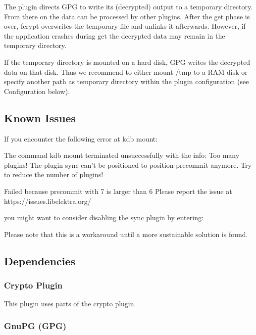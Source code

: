 The plugin directs G\+PG to write its (decrypted) output to a temporary directory. From there on the data can be processed by other plugins. After the {\ttfamily get} phase is over, {\ttfamily fcrypt} overwrites the temporary file and unlinks it afterwards. However, if the application crashes during {\ttfamily get} the decrypted data may remain in the temporary directory.

If the temporary directory is mounted on a hard disk, G\+PG writes the decrypted data on that disk. Thus we recommend to either mount {\ttfamily /tmp} to a R\+AM disk or specify another path as temporary directory within the plugin configuration (see Configuration below).

\subsection*{Known Issues}

If you encounter the following error at {\ttfamily kdb mount}\+: \begin{DoxyVerb}    The command kdb mount terminated unsuccessfully with the info:
    Too many plugins!
    The plugin sync can't be positioned to position precommit anymore.
    Try to reduce the number of plugins!

    Failed because precommit with 7 is larger than 6
    Please report the issue at https://issues.libelektra.org/
\end{DoxyVerb}


you might want to consider disabling the sync plugin by entering\+: 


Please note that this is a workaround until a more sustainable solution is found.

\subsection*{Dependencies}

\subsubsection*{Crypto Plugin}

This plugin uses parts of the {\ttfamily crypto} plugin.

\subsubsection*{Gnu\+PG (G\+PG)}

